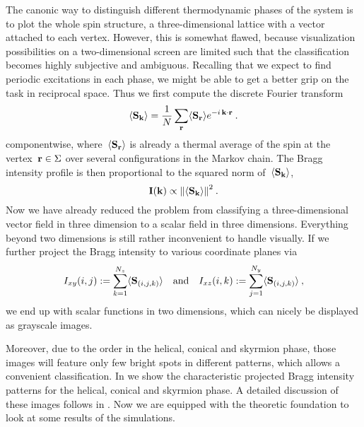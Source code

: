 The canonic way to distinguish different thermodynamic phases of the system is
to plot the whole spin structure, \ie{} a three-dimensional lattice with a
vector attached to each vertex. However, this is somewhat flawed, because
visualization possibilities on a two-dimensional screen are limited such that
the classification becomes highly subjective and ambiguous. Recalling that we
expect to find periodic excitations in each phase, we might be able to get a
better grip on the task in reciprocal space. Thus we first compute the discrete
Fourier transform
%
\begin{equation}
  \langle \mathbf{S}_{\mathbf{k}} \rangle = \frac{1}{N} \sum_{\mathbf{r}} \langle \mathbf{S}_{\mathbf{r}} \rangle e^{- i\, \mathbf{k} \cdot \mathbf{r}}\:.
\end{equation}
%
componentwise, where~$\langle \mathbf{S}_{\mathbf{r}} \rangle$ is already a thermal average of the spin at
the vertex~$\mathbf{r} \in \Sigma$ over several configurations in the Markov chain. The
Bragg intensity profile is then proportional to the squared norm
of~$\langle \mathbf{S}_{\mathbf{k}} \rangle$,
%
\begin{equation}
  \mathbf{I}(\k) \propto \norm{\avg{\S_{\k}}}^2 \:.
\end{equation}
%
Now we have already reduced the problem from classifying a three-dimensional
vector field in three dimension to a scalar field in three dimensions.
Everything beyond two dimensions is still rather inconvenient to handle
visually. If we further project the Bragg intensity to various coordinate planes
via
%
\begin{equation}\label{braggproj}
  I_{xy} (i,j) := \sum_{k = 1}^{N_z} \langle \mathbf{S}_{(i,j,k)} \rangle \quad\text{and}\quad
  I_{xz} (i,k) := \sum_{j = 1}^{N_y} \langle \mathbf{S}_{(i,j,k)} \rangle\:,
\end{equation}
%
we end up with scalar functions in two dimensions, which can nicely be displayed
as grayscale images.

Moreover, due to the order in the helical, conical and skyrmion phase, those
images will feature only few bright spots in different patterns, which allows a
convenient classification. In  we show the characteristic
projected Bragg intensity patterns for the helical, conical and skyrmion phase.
A detailed discussion of these images follows in . Now
we are equipped with the theoretic foundation to look at some results of the
simulations.
